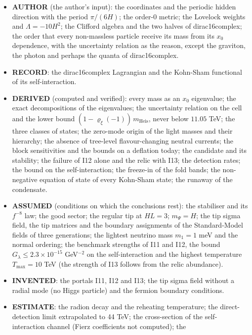 \documentclass[
  10pt,
]{article}
\providecommand{\tightlist}{%
  \setlength{\itemsep}{0pt}\setlength{\parskip}{0pt}}
\begin{document}
\begin{itemize}
\tightlist
\item
  \textbf{AUTHOR} (the author's input): the coordinates and the periodic
  hidden direction with the period \(\pi/(6H)\); the order-0 metric; the
  Lovelock weights and \(\Lambda = -10H^2\); the Clifford algebra and
  the two halves of dirac16complex; the order that every non-massless
  particle receive its mass from its \(x_0\) dependence, with the
  uncertainty relation as the reason, except the graviton, the photon
  and perhaps the quanta of dirac16complex.
\item
  \textbf{RECORD}: the dirac16complex Lagrangian and the Kohn-Sham
  functional of its self-interaction.
\item
  \textbf{DERIVED} (computed and verified): every mass as an \(x_0\)
  eigenvalue; the exact decompositions of the eigenvalues; the
  uncertainty relation on the cell and the lower bound
  \((1 - \varrho_\xi(-1))\,m_{\mathrm{Heis}}\), never below \(11.05\)
  TeV; the three classes of states; the zero-mode origin of the light
  masses and their hierarchy; the absence of tree-level flavour-changing
  neutral currents; the block sensitivities and the bounds on a
  deflation today; the candidate and its stability; the failure of I12
  alone and the relic with I13; the detection rates; the bound on the
  self-interaction; the freeze-in of the fold bands; the non-negative
  equation of state of every Kohn-Sham state; the runaway of the
  condensate.
\item
  \textbf{ASSUMED} (conditions on which the conclusions rest): the
  stabiliser and its \(f^{-8}\) law; the good sector; the regular tip at
  \(HL = 3\); \(m_\Psi = H\); the tip sigma field, the tip matrices and
  the boundary assignments of the Standard-Model fields of three
  generations; the lightest neutrino mass \(m_1 = 1\) meV and the normal
  ordering; the benchmark strengths of I11 and I12, the bound
  \(G_\lambda \le 2.3\times10^{-15}\) GeV\(^{-2}\) on the
  self-interaction and the highest temperature \(T_{\mathrm{max}} = 10\)
  TeV (the strength of I13 follows from the relic abundance).
\item
  \textbf{INVENTED}: the portals I11, I12 and I13; the tip sigma field
  without a radial mode (no Higgs particle) and the fermion boundary
  conditions.
\item
  \textbf{ESTIMATE}: the radion decay and the reheating temperature; the
  direct-detection limit extrapolated to 44 TeV; the cross-section of
  the self-interaction channel (Fierz coefficients not computed); the

\end{itemize}
\end{document}
